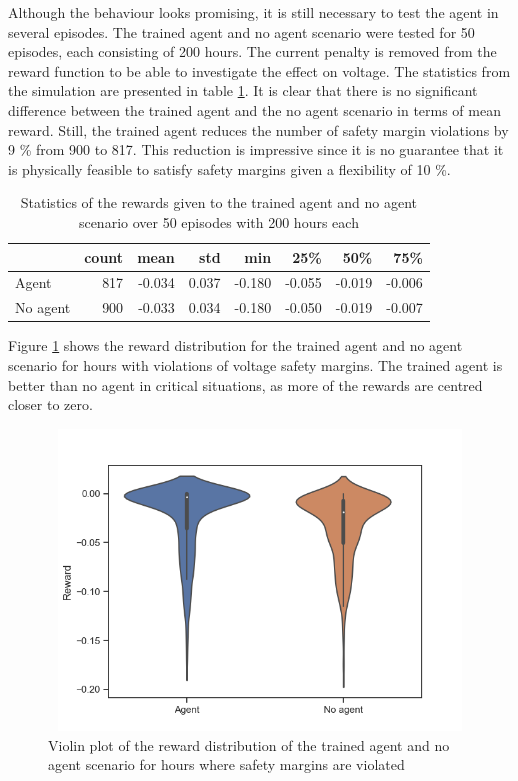 \documentclass[class=book, crop=false]{standalone}
\begin{document}
Although the behaviour looks promising, it is still necessary to test the agent in several episodes. The trained agent and no agent scenario were tested for 50 episodes, each consisting of 200 hours. The current penalty is removed from the reward function to be able to investigate the effect on voltage. The statistics from the simulation are presented in table \ref{table:results:configuration1_reward_50_episodes}. It is clear that there is no significant difference between the trained agent and the no agent scenario in terms of mean reward. Still, the trained agent reduces the number of safety margin violations by 9 \% from 900 to 817. This reduction is impressive since it is no guarantee that it is physically feasible to satisfy safety margins given a flexibility of 10 \%.
\begin{table}[ht]
\center
\label{table:results:configuration1_reward_50_episodes}
\caption{Statistics of the rewards given to the trained agent and no agent scenario over 50 episodes with 200 hours each}


\begin{tabular}{l|rrrrrrr}
         & count & mean   & std   & min    & 25\%   & 50\%   & 75\%   \\
\hline
Agent    & 817   & -0.034 & 0.037 & -0.180 & -0.055 & -0.019 & -0.006 \\
No agent & 900   & -0.033 & 0.034 & -0.180 & -0.050 & -0.019 & -0.007 \\
\hline
\end{tabular}
\end{table}

Figure \ref{fig:results:configuration1_violin_voltage} shows the reward distribution for the trained agent and no agent scenario for hours with violations of voltage safety margins. The trained agent is better than no agent in critical situations, as more of the rewards are centred closer to zero.

\begin{figure}[ht]
    \center
\includegraphics[height=8cm, width=12cm]{figures/violin_voltage_reward_config1.png}
    \caption[size = 9]{Violin plot of the reward distribution of the trained agent and no agent scenario for hours where safety margins are violated}
    \label{fig:results:configuration1_violin_voltage}
\end{figure}
\end{document}
